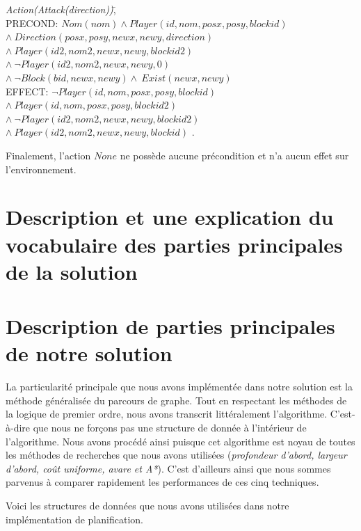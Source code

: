 \documentclass[12pt,english,frenchb,letterpaper]{article}
\begin{document}
\begin{tabbing}
\textit{Action}\=\textit{(Attack(direction))}\=,\\
\> PRECOND: \> $Nom(nom) \wedge Player(id,nom,posx,posy,blockid)$ \\ 
\> \> $  \wedge \ Direction(posx,posy,newx,newy,direction) $ \\
\> \> $  \wedge \ Player(id2,nom2,newx,newy,blockid2) $ \\
\> \> $  \wedge \ \lnot Player(id2,nom2,newx,newy,0) $ \\
\> \> $ \wedge\ \lnot Block(bid,newx,newy) \wedge \ Exist(newx,newy)$ \\               
\> EFFECT: \>$ \lnot Player(id,nom,posx,posy,blockid) $ \\
\>  \> $\wedge\ Player(id,nom,posx,posy,blockid2)$ \\
\>  \> $\wedge\ \lnot Player(id2,nom2,newx,newy,blockid2)$ \\
\>  \> $\wedge\ Player(id2,nom2,newx,newy,blockid)$ .\\
\end{tabbing}

Finalement, l'action $None$ ne possède aucune précondition et n'a aucun effet sur l'environnement.

\section{Description et une explication du vocabulaire des parties principales de la solution}

\section{Description de parties principales de notre solution}
La particularité principale que nous avons implémentée dans notre solution est la méthode généralisée du parcours de graphe. Tout en respectant les méthodes de la logique de premier ordre, nous avons transcrit littéralement l'algorithme. C'est-à-dire que nous ne forçons pas une structure de donnée à l'intérieur de l'algorithme. Nous avons procédé ainsi puisque cet algorithme est noyau de toutes les méthodes de recherches que nous avons utilisées (\textit{profondeur d'abord, largeur d'abord, coût uniforme, avare et A*}). C'est d'ailleurs ainsi que nous sommes parvenus à comparer rapidement les performances de ces cinq techniques.

Voici les structures de données que nous avons utilisées dans notre implémentation de planification.
\end{document}
